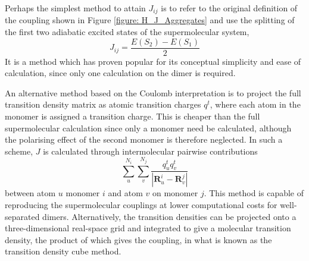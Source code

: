 Perhaps the simplest method to attain $J_{ij}$ is to refer to the original definition of the coupling shown in Figure \ref{figure: H_J_Aggregates} and use the splitting of the first two adiabatic excited states of the supermolecular system,
\begin{equation}
    J_{ij}=\frac{E(S_{2})-E(S_{1})}{2}
\end{equation}
It is a method which has proven popular for its conceptual simplicity and ease of calculation, since only one calculation on the dimer is required.\cite{Hsu2009,Gierschner2013a,Shi2017}

An alternative method based on the Coulomb interpretation is to project the full transition density matrix as atomic transition charges $q^{t}$, where each atom in the monomer is assigned a transition charge. This is cheaper than the full supermolecular calculation since only a monomer need be calculated, although the polarising effect of the second monomer is therefore neglected. In such a scheme, $J$ is calculated through intermolecular pairwise contributions
\begin{equation}\label{equation: J_TC}
\sum_{u}^{N_{i}}\sum_{v}^{N_{j}}\frac{q^{t}_{u}q^{t}_{v}}{|\bm{R}_{u}^{i}-\bm{R}_{v}^{j}|}
\end{equation}
between atom $u$ monomer $i$ and atom $v$ on monomer $j$. This method is capable of reproducing the supermolecular couplings at lower computational costs for well-separated dimers.\cite{Kistler2013} Alternatively, the transition densities can be projected onto a three-dimensional real-space grid and integrated to give a molecular transition density, the product of which gives the coupling, in what is known as the transition density cube method.\cite{Bricker2014}

